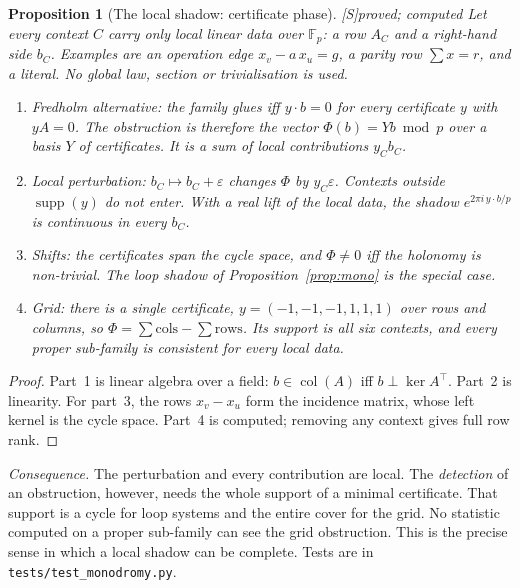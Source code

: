 \documentclass[11pt]{article}
\newtheorem{proposition}[theorem]{Proposition}
\theoremstyle{definition}
\theoremstyle{remark}
\newcommand{\F}{\mathbb{F}}
\newcommand{\src}[1]{\textsf{\small[#1]}}
\newcommand{\st}[1]{\textsf{\small\color{gray}#1}}
\begin{document}
\begin{proposition}[The local shadow: certificate phase]\label{prop:certphase}\src{S}\st{proved; computed}
Let every context $C$ carry only \emph{local} linear data over $\F_p$: a row $A_C$ and a right-hand side $b_C$. Examples are an operation edge $x_v-a\,x_u=g$, a parity row $\sum x=r$, and a literal. No global law, section or trivialisation is used.
\begin{enumerate}
  \item \emph{Fredholm alternative}: the family glues iff $y\cdot b=0$ for every certificate $y$ with $yA=0$. The obstruction is therefore the vector $\Phi(b)=Yb \bmod p$ over a basis $Y$ of certificates. It is a \emph{sum of local contributions} $y_Cb_C$.
  \item \emph{Local perturbation}: $b_C\mapsto b_C+\varepsilon$ changes $\Phi$ by $y_C\varepsilon$. Contexts outside $\operatorname{supp}(y)$ do not enter. With a real lift of the local data, the shadow $e^{2\pi i\,y\cdot b/p}$ is continuous in every $b_C$.
  \item \emph{Shifts}: the certificates span the cycle space, and $\Phi\neq0$ iff the holonomy is non-trivial. The loop shadow of Proposition~\ref{prop:mono} is the special case.
  \item \emph{Grid}: there is a single certificate, $y=(-1,-1,-1,1,1,1)$ over rows and columns, so $\Phi=\sum\text{cols}-\sum\text{rows}$. Its support is all six contexts, and every proper sub-family is consistent for \emph{every} local data.
\end{enumerate}
\end{proposition}
\begin{proof}
Part~1 is linear algebra over a field: $b\in\operatorname{col}(A)$ iff $b\perp\ker A^{\top}$. Part~2 is linearity. For part~3, the rows $x_v-x_u$ form the incidence matrix, whose left kernel is the cycle space. Part~4 is computed; removing any context gives full row rank.
\end{proof}
\noindent\emph{Consequence.} The perturbation and every contribution are local. The \emph{detection} of an obstruction, however, needs the whole support of a minimal certificate. That support is a cycle for loop systems and the entire cover for the grid. No statistic computed on a proper sub-family can see the grid obstruction. This is the precise sense in which a local shadow can be complete. Tests are in \texttt{tests/test\_monodromy.py}.
\end{document}
